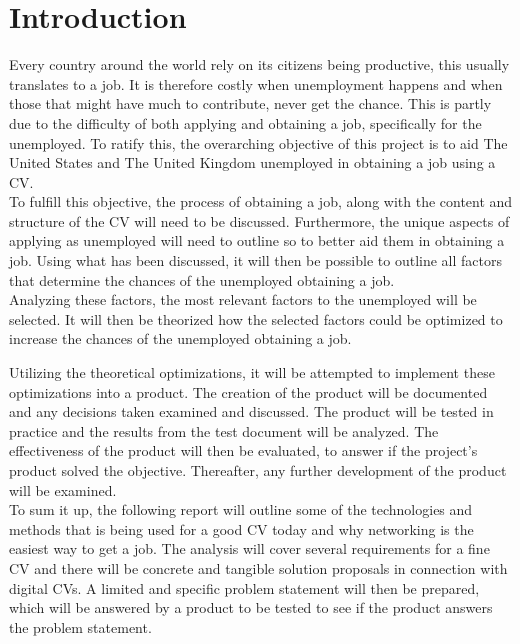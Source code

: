 \section{Introduction}\label{sec:introduction}
Every country around the world rely on its citizens being productive, this usually translates to a job. 
It is therefore costly when unemployment happens and when those that might have much to contribute, never get the chance. 
This is partly due to the difficulty of both applying and obtaining a job, specifically for the unemployed. 
To ratify this, the overarching objective of this project is to aid The United States and The United Kingdom unemployed in obtaining a job using a CV. \\

To fulfill this objective, the process of obtaining a job, along with the content and structure of the CV will need to be discussed.
Furthermore, the unique aspects of applying as unemployed will need to outline so to better aid them in obtaining a job.
Using what has been discussed, it will then be possible to outline all factors that determine the chances of the unemployed obtaining a job. \\

Analyzing these factors, the most relevant factors to the unemployed will be selected.
It will then be theorized how the selected factors could be optimized to increase the chances of the unemployed obtaining a job.

Utilizing the theoretical optimizations, it will be attempted to implement these optimizations into a product.
The creation of the product will be documented and any decisions taken examined and discussed. 
The product will be tested in practice and the results from the test document will be analyzed.
The effectiveness of the product will then be evaluated, to answer if the project's product solved the objective.
Thereafter, any further development of the product will be examined. \\

To sum it up, the following report will outline some of the technologies and methods 
that is being used for a good CV today and why networking is the easiest way to get a job. 
The analysis will cover several requirements for a fine CV 
and there will be concrete and tangible solution proposals in connection with digital CVs. 
A limited and specific problem statement will then be prepared, 
which will be answered by a product to be tested to see if the product answers the problem statement.

\newpage

